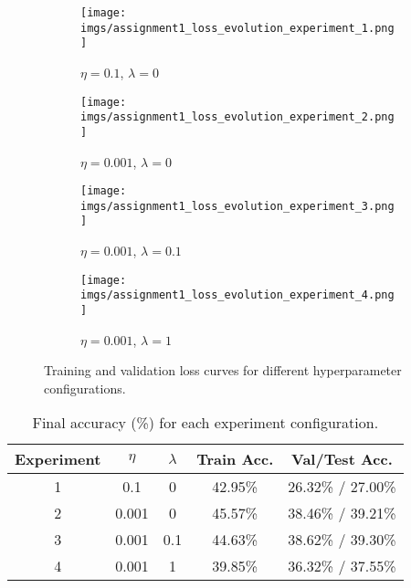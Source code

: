 \documentclass{article}
\begin{document}
\begin{figure}[h!]
    \centering
    \begin{subfigure}{0.45\textwidth}
        \texttt{[image: imgs/assignment1\_loss\_evolution\_experiment\_1.png]}
        \caption{$\eta=0.1$, $\lambda=0$}
        \label{fig:exp1}
    \end{subfigure}
    \begin{subfigure}{0.45\textwidth}
        \texttt{[image: imgs/assignment1\_loss\_evolution\_experiment\_2.png]}
        \caption{$\eta=0.001$, $\lambda=0$}
        \label{fig:exp2}
    \end{subfigure}
    \begin{subfigure}{0.45\textwidth}
        \texttt{[image: imgs/assignment1\_loss\_evolution\_experiment\_3.png]}
        \caption{$\eta=0.001$, $\lambda=0.1$}
        \label{fig:exp3}
    \end{subfigure}
    \begin{subfigure}{0.45\textwidth}
        \texttt{[image: imgs/assignment1\_loss\_evolution\_experiment\_4.png]}
        \caption{$\eta=0.001$, $\lambda=1$}
        \label{fig:exp4}
    \end{subfigure}
    \caption{Training and validation loss curves for different hyperparameter configurations.}
    \label{fig:loss_experiments}
\end{figure}

\begin{table}[h!]
    \centering
    \caption{Final accuracy (\%) for each experiment configuration.}
    \label{tab:experiment_results}
    \begin{tabular}{|c|c|c|c|c|}
        \hline
        \textbf{Experiment} & \boldmath$\eta$ & \boldmath$\lambda$ & \textbf{Train Acc.} & \textbf{Val/Test Acc.} \\
        \hline
        1 & 0.1   & 0   & 42.95\% & 26.32\% / 27.00\% \\
        2 & 0.001 & 0   & 45.57\% & 38.46\% / 39.21\% \\
        3 & 0.001 & 0.1 & 44.63\% & 38.62\% / 39.30\% \\
        4 & 0.001 & 1   & 39.85\% & 36.32\% / 37.55\% \\
        \hline
    \end{tabular}
\end{table}
\end{document}
